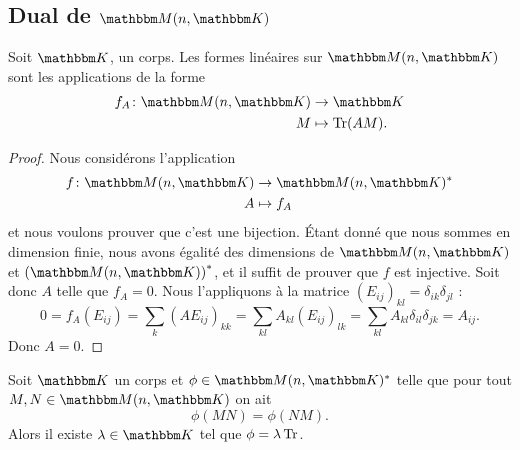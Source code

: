 \subsection{Dual de \texorpdfstring{$ \eM(n,\eK)$}{M(n,K)}}

\begin{proposition}     \label{PropHOjJpCa}
    Soit \( \eK\), un corps. Les formes linéaires sur \( \eM(n,\eK)\) sont les applications de la forme
    \begin{equation}
        \begin{aligned}
            f_A\colon \eM(n,\eK)&\to \eK \\
            M&\mapsto \tr(AM).
        \end{aligned}
    \end{equation}
\end{proposition}


\begin{proof}
    Nous considérons l'application
    \begin{equation}
        \begin{aligned}
            f\colon \eM(n,\eK)&\to \eM(n,\eK)^* \\
            A&\mapsto f_A
        \end{aligned}
    \end{equation}
    et nous voulons prouver que c'est une bijection. Étant donné que nous sommes en dimension finie, nous avons égalité des dimensions de \( \eM(n,\eK)\) et \( \left(\eM(n,\eK)\right)^*\), et il suffit de prouver que \( f\) est injective. Soit donc \( A\) telle que \( f_A=0\). Nous l'appliquons à la matrice \( (E_{ij})_{kl}=\delta_{ik}\delta_{jl}\) :
    \begin{equation}
            0=f_A(E_{ij})
            =\sum_{k}(AE_{ij})_{kk}
            =\sum_{kl}A_{kl}(E_{ij})_{lk}
            =\sum_{kl}A_{kl}\delta_{il}\delta_{jk}
            =A_{ij}.
    \end{equation}
    Donc \( A=0\).
\end{proof}

\begin{corollary}
    Soit \( \eK\) un corps et \( \phi\in\eM(n,\eK)^*\) telle que pour tout \( M,N\in \eM(n,\eK)\) on ait
    \begin{equation}
        \phi(MN)=\phi(NM).
    \end{equation}
    Alors il existe \( \lambda\in \eK\) tel que \( \phi=\lambda\operatorname{Tr}\).
\end{corollary}

